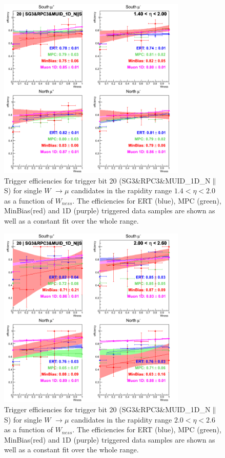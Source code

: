 \begin{figure}[ht]
\begin{center}
\includegraphics[width=0.8\textwidth]{./figures/run13_trigeffisn_eta1_trig20_lin.png}
\caption{\label{fig:run13_trigeffisn_eta1_nper0_trig20_lin} Trigger efficiencies for trigger bit 20 (SG3\&RPC3\&MUID\_1D\_N$\|$S) for single $W$ $\rightarrow \mu$ candidates in the rapidity range $ 1.4 < \eta < 2.0$ as a function of $W_{ness}$. The efficiencies for ERT (blue), MPC (green), MinBias(red) and 1D (purple) triggered data samples are shown as well as a constant fit over the whole range.}
\end{center}
\end{figure}
\begin{figure}[ht]
\begin{center}
\includegraphics[width=0.8\textwidth]{./figures/run13_trigeffisn_eta2_trig20_lin.png}
\caption{\label{fig:run13_trigeffisn_eta2_nper0_trig20_lin} Trigger efficiencies for trigger bit 20 (SG3\&RPC3\&MUID\_1D\_N$\|$S) for single $W$ $\rightarrow \mu$ candidates in the rapidity range $ 2.0 < \eta < 2.6$ as a function of $W_{ness}$. The efficiencies for ERT (blue), MPC (green), MinBias(red) and 1D (purple) triggered data samples are shown as well as a constant fit over the whole range.}
\end{center}
\end{figure}

